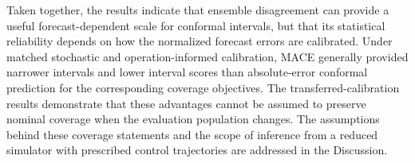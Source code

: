 Taken together, the results indicate that ensemble disagreement can provide a useful forecast-dependent scale for conformal intervals, but that its statistical reliability depends on how the normalized forecast errors are calibrated. Under matched stochastic and operation-informed calibration, MACE generally provided narrower intervals and lower interval scores than absolute-error conformal prediction for the corresponding coverage objectives. The transferred-calibration results demonstrate that these advantages cannot be assumed to preserve nominal coverage when the evaluation population changes. The assumptions behind these coverage statements and the scope of inference from a reduced simulator with prescribed control trajectories are addressed in the Discussion.
